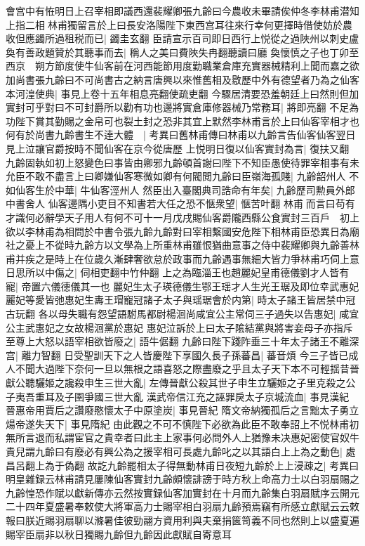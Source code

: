 會宫中有恠明日上召宰相即議西還裴耀卿張九齡曰今農收未畢請俟仲冬李林甫潜知上指二相林甫獨留言於上曰長安洛陽陛下東西宫耳往來行幸何更擇時借使妨於農收但應蠲所過租税而已|{
	蠲圭玄翻}
臣請宣示百司即日西行上悦從之過陜州以刺史盧奐有善政題贊於其聽事而去|{
	稱人之美曰費陜失冉翻聽讀曰廳}
奐懷慎之子也丁卯至西京　朔方節度使牛仙客前在河西能節用度勤職業倉庫充實器械精利上聞而嘉之欲加尚書張九齡曰不可尚書古之納言唐興以來惟舊相及敭歷中外有德望者乃為之仙客本河湟使典|{
	事見上卷十五年相息亮翻使疏吏翻}
今驟居清要恐羞朝廷上曰然則但加實封可乎對曰不可封爵所以勸有功也邊將實倉庫修器械乃常務耳|{
	將即亮翻}
不足為功陛下賞其勤賜之金帛可也裂土封之恐非其宜上默然李林甫言於上曰仙客宰相才也何有於尚書九齡書生不逹大體　|{
	考異曰舊林甫傳曰林甫以九齡言告仙客仙客翌日見上泣讓官爵按時不聞仙客在京今從唐歷}
上悦明日復以仙客實封為言|{
	復扶又翻}
九齡固執如初上怒變色曰事皆由卿邪九齡頓首謝曰陛下不知臣愚使待罪宰相事有未允臣不敢不盡言上曰卿嫌仙客寒微如卿有何閥閲九齡曰臣嶺海孤賤|{
	九齡韶州人}
不如仙客生於中華|{
	牛仙客涇州人}
然臣出入臺閣典司誥命有年矣|{
	九齡歷司勲員外郎中書舍人}
仙客邊隅小吏目不知書若大任之恐不愜衆望|{
	愜苦叶翻}
林甫而言曰苟有才識何必辭學天子用人有何不可十一月戊戌賜仙客爵隴西縣公食實封三百戶　初上欲以李林甫為相問於中書令張九齡九齡對曰宰相繫國安危陛下相林甫臣恐異日為廟社之憂上不從時九齡方以文學為上所重林甫雖恨猶曲意事之侍中裴耀卿與九齡善林甫并疾之是時上在位歲久漸肆奢欲怠於政事而九齡遇事無細大皆力爭林甫巧伺上意日思所以中傷之|{
	伺相吏翻中竹仲翻}
上之為臨淄王也趙麗妃皇甫德儀劉才人皆有寵|{
	帝置六儀德儀其一也}
麗妃生太子瑛德儀生鄂王瑶才人生光王琚及即位幸武惠妃麗妃等愛皆弛惠妃生夀王瑁寵冠諸子太子與瑶琚會於内第|{
	時太子諸王皆居禁中冠古玩翻}
各以母失職有怨望語駙馬都尉楊洄尚咸宜公主常伺三子過失以告惠妃|{
	咸宜公主武惠妃之女故楊洄黨於惠妃}
惠妃泣訴於上曰太子隂結黨與將害妾母子亦指斥至尊上大怒以語宰相欲皆廢之|{
	語牛倨翻}
九齡曰陛下踐阼垂三十年太子諸王不離深宫|{
	離力智翻}
日受聖訓天下之人皆慶陛下享國久長子孫蕃昌|{
	蕃音煩}
今三子皆已成人不聞大過陛下奈何一旦以無根之語喜怒之際盡廢之乎且太子天下本不可輕揺昔晉獻公聽驪姬之讒殺申生三世大亂|{
	左傳晉獻公殺其世子申生立驪姬之子里克殺之公子夷吾重耳及子圉爭國三世大亂}
漢武帝信江充之誣罪戾太子京城流血|{
	事見漢紀}
晉惠帝用賈后之讚廢愍懷太子中原塗炭|{
	事見晉紀}
隋文帝納獨孤后之言黜太子勇立煬帝遂失天下|{
	事見隋紀}
由此觀之不可不慎陛下必欲為此臣不敢奉詔上不悦林甫初無所言退而私謂宦官之貴幸者曰此主上家事何必問外人上猶豫未决惠妃密使官奴牛貴兒謂九齡曰有廢必有興公為之援宰相可長處九齡叱之以其語白上上為之動色|{
	處昌呂翻上為于偽翻}
故訖九齡罷相太子得無動林甫日夜短九齡於上上浸疎之|{
	考異曰明皇雜録云林甫請見屢陳仙客實封九齡頗懷誹謗于時方秋上命高力士以白羽扇賜之九齡惶恐作賦以獻新傳亦云然按實録仙客加實封在十月而九齡集白羽扇賦序云開元二十四年夏盛暑奉敕使大將軍高力士賜宰相白羽扇九齡預焉竊有所感立獻賦云云敕報曰朕近賜羽扇聊以滌暑佳彼勁翮方資用利與夫棄捐篋笥義不同也然則上以盛夏遍賜宰臣扇非以秋日獨賜九齡但九齡因此獻賦自寄意耳}
